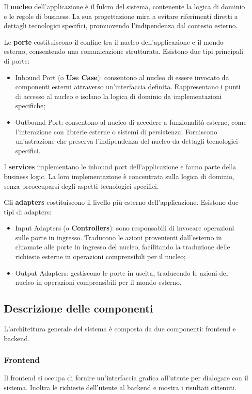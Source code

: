 \documentclass[10pt, a4paper]{article}
\begin{document}
Il \textbf{nucleo} dell'applicazione è il fulcro del sistema, contenente la logica di dominio e le regole di business. La sua progettazione mira a evitare riferimenti diretti a dettagli tecnologici specifici, promuovendo l'indipendenza dal contesto esterno.

Le \textbf{porte} costituiscono il confine tra il nucleo dell'applicazione e il mondo esterno, consentendo una comunicazione strutturata. Esistono due tipi principali di porte:
\begin{itemize}
    \item Inbound Port (o \textbf{Use Case}): consentono al nucleo di essere invocato da componenti esterni attraverso un'interfaccia definita. Rappresentano i punti di accesso al nucleo e isolano la logica di dominio da implementazioni specifiche;
    \item Outbound Port: consentono al nucleo di accedere a funzionalità esterne, come l'interazione con librerie esterne o sistemi di persistenza. Forniscono un'astrazione che preserva l'indipendenza del nucleo da dettagli tecnologici specifici.  
\end{itemize}

I \textbf{services} implementano le inbound port dell'applicazione e fanno parte della business logic. La loro implementazione è concentrata sulla logica di dominio, senza preoccuparsi degli aspetti tecnologici specifici.

Gli \textbf{adapters} costituiscono il livello più esterno dell'applicazione. Esistono due tipi di adapters:
\begin{itemize}
    \item Input Adapters (o \textbf{Controllers}): sono responsabili di invocare operazioni sulle porte in ingresso. Traducono le azioni provenienti dall'esterno in chiamate alle porte in ingresso del nucleo, facilitando la traduzione delle richieste esterne in operazioni comprensibili per il nucleo;
    \item Output Adapters: gestiscono le porte in uscita, traducendo le azioni del nucleo in operazioni comprensibili per il mondo esterno.
\end{itemize}

\subsection{Descrizione delle componenti}
L'architettura generale del sistema è composta da due componenti: frontend e backend.

\subsubsection{Frontend}
Il frontend si occupa di fornire un'interfaccia grafica all'utente per dialogare con il sistema. Inoltra le richieste dell'utente al backend e mostra i risultati ottenuti.
\end{document}
